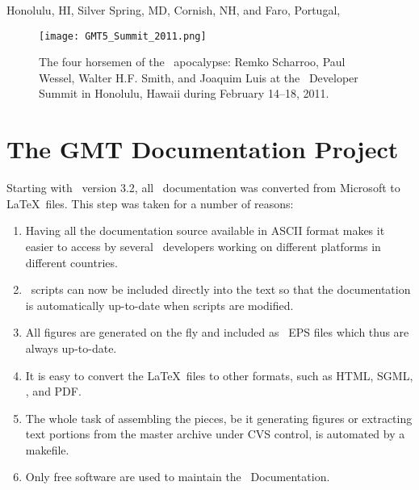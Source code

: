 \begin{flushright}
Honolulu, HI, Silver Spring, MD, Cornish, NH, and Faro, Portugal, \GMTDOCDATE
\end{flushright}

\noindent
\begin{figure}[H]
	\centering
	\texttt{[image: GMT5\_Summit\_2011.png]}
	\caption{The four horsemen of the \GMT\ apocalypse: Remko Scharroo, Paul Wessel,
	Walter H.F. Smith, and Joaquim Luis at the \GMT\ Developer Summit in Honolulu,
	Hawaii during February 14--18, 2011.}
\end{figure}


\chapter*{The GMT Documentation Project}

Starting with \GMT\ version 3.2, all \GMT\ documentation was
converted from Microsoft  to \LaTeX\ files.
This step was taken for a number of reasons:

\begin{enumerate}

\item Having all the documentation source available in
ASCII format makes it easier to access by several
\GMT\ developers working on different platforms in 
different countries.

\item \GMT\ scripts can now be included directly into the text
so that the documentation is automatically up-to-date
when scripts are modified.

\item All figures are generated on the fly and included as
\GMT\ EPS files which thus are always up-to-date.

\item It is easy to convert the \LaTeX\ files to other
formats, such as HTML, SGML, \PS, and PDF.

\item The whole task of assembling the pieces, be it generating
figures or extracting text portions from the master archive under
CVS control, is automated by a makefile.

\item Only free software are used to maintain the \GMT\ Documentation.

\end{enumerate}

